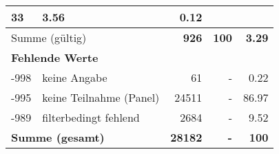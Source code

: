 \begin{longtable}{lXrrr}
       \num{33} &
       \num[round-mode=places,round-precision=2]{3.56} &
         \num[round-mode=places,round-precision=2]{0.12} \\
     \midrule
     \multicolumn{2}{l}{Summe (gültig)} &
       \textbf{\num{926}} &
     \textbf{100} &
       \textbf{\num[round-mode=places,round-precision=2]{3.29}} \\
     \multicolumn{5}{l}{\textbf{Fehlende Werte}}\\
       -998 &
       keine Angabe &
         \num{61} &
        - &
         \num[round-mode=places,round-precision=2]{0.22} \\
       -995 &
       keine Teilnahme (Panel) &
         \num{24511} &
        - &
         \num[round-mode=places,round-precision=2]{86.97} \\
       -989 &
       filterbedingt fehlend &
         \num{2684} &
        - &
         \num[round-mode=places,round-precision=2]{9.52} \\
     \midrule
     \multicolumn{2}{l}{\textbf{Summe (gesamt)}} &
          \textbf{\num{28182}} &
        \textbf{-} &
        \textbf{100} \\
     \bottomrule
     \end{longtable}
     
